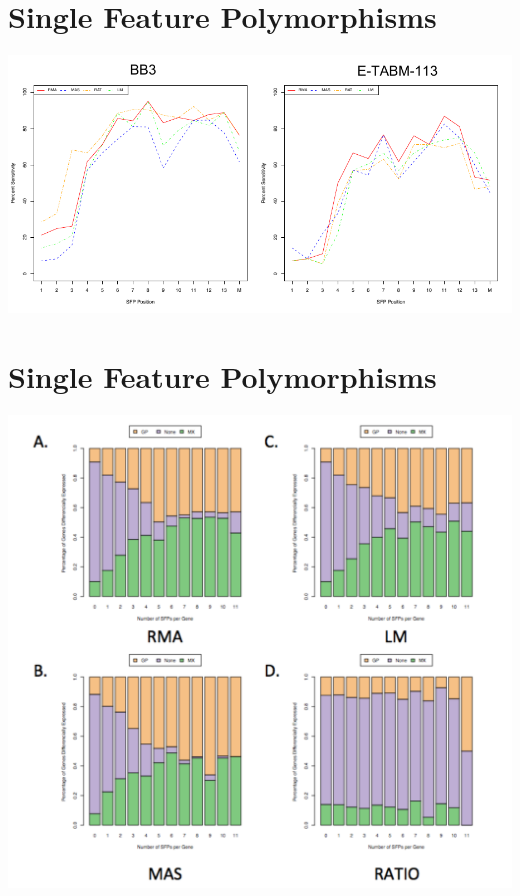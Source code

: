 \documentclass[pdf]{beamer}
\begin{document}
\section{Single Feature Polymorphisms}
\begin{frame}[allowframebreaks]
\begin{center}
\includegraphics[scale=0.6]{figures/Figure2-SFPpositionSensitivity.pdf} 
\end{center}
\end{frame}

\section{Single Feature Polymorphisms}
\begin{frame}[allowframebreaks]
\begin{center}
\includegraphics[scale=0.3]{figures/BB3geneXsfp.pdf} 
\end{center}
\end{frame}
\end{document}
